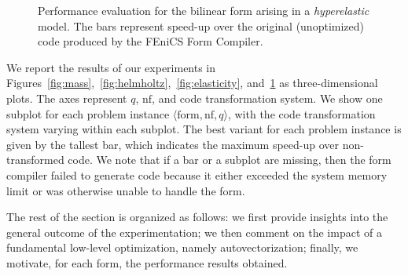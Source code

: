 \begin{figure}
\caption{Performance evaluation for the bilinear form arising in a \textit{hyperelastic} model. The bars represent speed-up over the original (unoptimized) code produced by the FEniCS Form Compiler.}\label{fig:hyperelasticity}
\end{figure}

We report the results of our experiments in Figures~\ref{fig:mass},~\ref{fig:helmholtz},~\ref{fig:elasticity}, and~\ref{fig:hyperelasticity} as three-dimensional plots. The axes represent $q$, $\mathrm{nf}$, and code transformation system. We show one subplot for each problem instance ${\langle} \textrm{form}, \mathrm{nf}, q {\rangle}$, with the code transformation system varying within each subplot. The best variant for each problem instance is given by the tallest bar, which indicates the maximum speed-up over non-transformed code. We note that if a bar or a subplot are missing, then the form compiler failed to generate code because it either exceeded the system memory limit or was otherwise unable to handle the form. 

The rest of the section is organized as follows: we first provide insights into the general outcome of the experimentation; we then comment on the impact of a fundamental low-level optimization, namely autovectorization; finally, we motivate, for each form, the performance results obtained.

